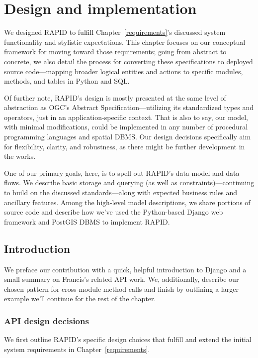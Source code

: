 \chapter{Design and implementation}
\label{design}

We designed RAPID to fulfill Chapter~\ref{requirements}'s discussed system functionality and stylistic expectations. This chapter focuses on our conceptual framework for moving toward those requirements; going from abstract to concrete, we also detail the process for converting these specifications to deployed source code---mapping broader logical entities and actions to specific modules, methods, and tables in Python and SQL.

Of further note, RAPID's design is mostly presented at the same level of abstraction as OGC's Abstract Specification---utilizing its standardized types and operators, just in an application-specific context. That is also to say, our model, with minimal modifications, could be implemented in any number of procedural programming languages and spatial DBMS. Our design decisions specifically aim for flexibility, clarity, and robustness, as there might be further development in the works.

One of our primary goals, here, is to spell out RAPID's data model and data flows. We describe basic storage and querying (as well as constraints)---continuing to build on the discussed standards---along with expected business rules and ancillary features. Among the high-level model descriptions, we share portions of source code and describe how we've used the Python-based Django web framework and PostGIS DBMS to implement RAPID.





\section{Introduction}
We preface our contribution with a quick, helpful introduction to Django and a small summary on Francis's related API work. We, additionally, describe our chosen pattern for cross-module method calls and finish by outlining a larger example we'll continue for the rest of the chapter.

\subsection{API design decisions}
We first outline RAPID's specific design choices that fulfill and extend the initial system requirements in Chapter~\ref{requirements}.

